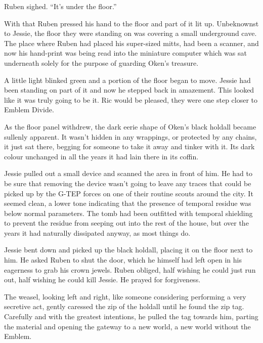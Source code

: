 Ruben sighed.  ``It's under the floor.''

With that Ruben pressed his hand to the floor and part of it lit up.  Unbeknownst to Jessie, the floor they were standing on was covering a small underground cave.  The place where Ruben had placed his super-sized mitts, had been a scanner, and now his hand-print was being read into the miniature computer which was sat underneath solely for the purpose of guarding Oken's treasure.

A little light blinked green and a portion of the floor began to move.  Jessie had been standing on part of it and now he stepped back in amazement.  This looked like it was truly going to be it.  Ric would be pleased, they were one step closer to Emblem Divide.  

As the floor panel withdrew, the dark eerie shape of Oken's black holdall became sullenly apparent.  It wasn't hidden in any wrappings, or protected by any chains, it just sat there, begging for someone to take it away and tinker with it.  Its dark colour unchanged in all the years it had lain there in its coffin.

Jessie pulled out a small device and scanned the area in front of him.  He had to be sure that removing the device wasn't going to leave any traces that could be picked up by the G-TEP forces on one of their routine scouts around the city.  It seemed clean, a lower tone indicating that the presence of temporal residue was below normal parameters.  The tomb had been outfitted with temporal shielding to prevent the residue from seeping out into the rest of the house, but over the years it had naturally dissipated anyway, as most things do.

Jessie bent down and picked up the black holdall, placing it on the floor next to him.  He asked Ruben to shut the door, which he himself had left open in his eagerness to grab his crown jewels.  Ruben obliged, half wishing he could just run out, half wishing he could kill Jessie.  He prayed for forgiveness.

The weasel, looking left and right, like someone considering performing a very secretive act, gently caressed the zip of the holdall until he found the zip tag.  Carefully and with the greatest intentions, he pulled the tag towards him, parting the material and opening the gateway to a new world, a new world without the Emblem.



\thoughtbreak



